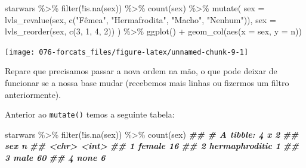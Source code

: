 \documentclass[
]{book}
\newenvironment{Shaded}{\begin{snugshade}}{\end{snugshade}}
\newcommand{\AttributeTok}[1]{\textcolor[rgb]{0.77,0.63,0.00}{#1}}
\newcommand{\DecValTok}[1]{\textcolor[rgb]{0.00,0.00,0.81}{#1}}
\newcommand{\DocumentationTok}[1]{\textcolor[rgb]{0.56,0.35,0.01}{\textbf{\textit{#1}}}}
\newcommand{\FunctionTok}[1]{\textcolor[rgb]{0.00,0.00,0.00}{#1}}
\newcommand{\NormalTok}[1]{#1}
\newcommand{\SpecialCharTok}[1]{\textcolor[rgb]{0.00,0.00,0.00}{#1}}
\newcommand{\StringTok}[1]{\textcolor[rgb]{0.31,0.60,0.02}{#1}}
\begin{document}
\begin{Shaded}
\begin{Highlighting}[]
\NormalTok{starwars }\SpecialCharTok{\%\textgreater{}\%} 
  \FunctionTok{filter}\NormalTok{(}\SpecialCharTok{!}\FunctionTok{is.na}\NormalTok{(sex)) }\SpecialCharTok{\%\textgreater{}\%} 
  \FunctionTok{count}\NormalTok{(sex) }\SpecialCharTok{\%\textgreater{}\%} 
  \FunctionTok{mutate}\NormalTok{(}
    \AttributeTok{sex =} \FunctionTok{lvls\_revalue}\NormalTok{(sex, }\FunctionTok{c}\NormalTok{(}\StringTok{"Fêmea"}\NormalTok{, }\StringTok{"Hermafrodita"}\NormalTok{, }\StringTok{"Macho"}\NormalTok{, }\StringTok{"Nenhum"}\NormalTok{)),}
    \AttributeTok{sex =} \FunctionTok{lvls\_reorder}\NormalTok{(sex, }\FunctionTok{c}\NormalTok{(}\DecValTok{3}\NormalTok{, }\DecValTok{1}\NormalTok{, }\DecValTok{4}\NormalTok{, }\DecValTok{2}\NormalTok{))}
\NormalTok{  ) }\SpecialCharTok{\%\textgreater{}\%} 
  \FunctionTok{ggplot}\NormalTok{() }\SpecialCharTok{+}
  \FunctionTok{geom\_col}\NormalTok{(}\FunctionTok{aes}\NormalTok{(}\AttributeTok{x =}\NormalTok{ sex, }\AttributeTok{y =}\NormalTok{ n)) }
\end{Highlighting}
\end{Shaded}

\begin{center}\texttt{[image: 076-forcats\_files/figure-latex/unnamed-chunk-9-1]} \end{center}

Repare que precisamos passar a nova ordem na mão, o que pode deixar de funcionar se a nossa base mudar (recebemos mais linhas ou fizermos um filtro anteriormente).

Anterior ao \texttt{mutate()} temos a seguinte tabela:

\begin{Shaded}
\begin{Highlighting}[]
\NormalTok{starwars }\SpecialCharTok{\%\textgreater{}\%} 
  \FunctionTok{filter}\NormalTok{(}\SpecialCharTok{!}\FunctionTok{is.na}\NormalTok{(sex)) }\SpecialCharTok{\%\textgreater{}\%} 
  \FunctionTok{count}\NormalTok{(sex) }
\DocumentationTok{\#\# \# A tibble: 4 x 2}
\DocumentationTok{\#\#   sex                n}
\DocumentationTok{\#\#   \textless{}chr\textgreater{}          \textless{}int\textgreater{}}
\DocumentationTok{\#\# 1 female            16}
\DocumentationTok{\#\# 2 hermaphroditic     1}
\DocumentationTok{\#\# 3 male              60}
\DocumentationTok{\#\# 4 none               6}
\end{Highlighting}
\end{Shaded}
\end{document}
